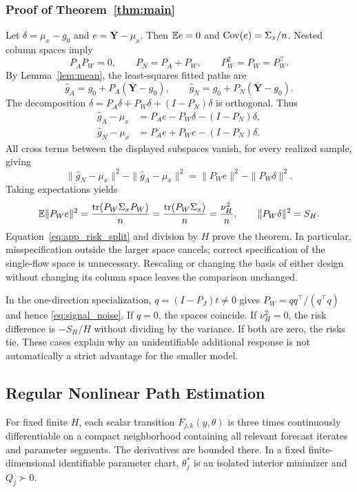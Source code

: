 \subsubsection{Proof of Theorem~\ref{thm:main}}
Let $\delta=\mu_x-g_0$ and $e=\overline{\mathbf Y}-\mu_x$. Then $\mathbb E e=0$ and $\operatorname{Cov}(e)=\Sigma_x/n$. Nested column spaces imply
\begin{equation}
 P_AP_W=0,\qquad P_N=P_A+P_W,\qquad P_W^2=P_W=P_W^\top.
 \label{eq:app_projection}
\end{equation}
By Lemma~\ref{lem:mean}, the least-squares fitted paths are
\[
 \widehat g_A=g_0+P_A(\overline{\mathbf Y}-g_0),\qquad
 \widehat g_N=g_0+P_N(\overline{\mathbf Y}-g_0).
\]
The decomposition $\delta=P_A\delta+P_W\delta+(I-P_N)\delta$ is orthogonal. Thus
\begin{align*}
 \widehat g_A-\mu_x&=P_Ae-P_W\delta-(I-P_N)\delta,\\
 \widehat g_N-\mu_x&=P_Ae+P_We-(I-P_N)\delta.
\end{align*}
All cross terms between the displayed subspaces vanish, for every realized sample, giving
\begin{equation}
 \|\widehat g_N-\mu_x\|^2-\|\widehat g_A-\mu_x\|^2
 =\|P_We\|^2-\|P_W\delta\|^2.
 \label{eq:app_pointwise}
\end{equation}
Taking expectations yields
\[
 \mathbb E\|P_We\|^2=\frac{\operatorname{tr}(P_W\Sigma_xP_W)}n
             =\frac{\operatorname{tr}(P_W\Sigma_x)}n=\frac{\nu_H^2}{n},
 \qquad \|P_W\delta\|^2=S_H.
\]
Equation~\eqref{eq:app_risk_split} and division by $H$ prove the theorem. In particular, misspecification outside the larger space cancels; correct specification of the single-flow space is unnecessary. Rescaling or changing the basis of either design without changing its column space leaves the comparison unchanged.

In the one-direction specialization, $q=(I-P_J)t\ne0$ gives $P_W=qq^\top/(q^\top q)$ and hence \eqref{eq:signal_noise}. If $q=0$, the spaces coincide. If $\nu_H^2=0$, the risk difference is $-S_H/H$ without dividing by the variance. If both are zero, the risks tie. These cases explain why an unidentifiable additional response is not automatically a strict advantage for the smaller model.

\subsection{Regular Nonlinear Path Estimation}
\label{app:neural}
\begin{assumption}
\label{ass:smooth}
For fixed finite $H$, each scalar transition $F_{j,k}(y,\theta)$ is three times continuously differentiable on a compact neighborhood containing all relevant forecast iterates and parameter segments. The derivatives are bounded there. In a fixed finite-dimensional identifiable parameter chart, $\theta_j^*$ is an isolated interior minimizer and $Q_j\succ0$.
\end{assumption}

